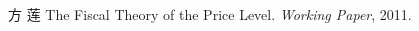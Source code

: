 \begin{publications}{2} %
    \item 方 莲
        The Fiscal Theory of the Price Level.
        \emph{Working Paper}, 2011.

\end{publications}
